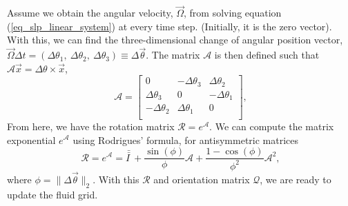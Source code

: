 Assume we obtain the angular velocity, $\vec{\Omega}$, from solving equation (\ref{eq_slp_linear_system}) at every time step. (Initially, it is the zero vector). With this, we can find the three-dimensional change of angular position vector, $ \vec{\Omega} \Delta t = \left( \Delta \theta_1, \ \Delta \theta_2, \ \Delta \theta_3 \right) \equiv \Delta \vec{\theta}$.
The matrix $\mathcal{A}$ is then defined such that $\mathcal{A} \vec{x} = \Delta \theta \times \vec{x}$,
\begin{equation}
	\mathcal{A}
	=\begin{bmatrix}
	 0 & - \Delta \theta_3 & \Delta \theta_2  \\
	 \Delta \theta_3 & 0  & -\Delta \theta_1  \\
	 - \Delta \theta_2 & \Delta \theta_1 & 0  \\
	\end{bmatrix},
	\label{eq_rotation_mx}
\end{equation}
From here, we have the rotation matrix $\mathcal{R} = e^{\mathcal{A}}.$
We can compute the matrix exponential $e^{\mathcal{A}}$ using Rodrigues' formula, for antisymmetric matrices
\begin{equation}
	\mathcal{R} = 
e^{\mathcal{A}} 
 = \bar{\bar{I \ }} 
 + \frac{\sin(\phi)}{\phi} \mathcal{A}
 + \frac{1-\cos(\phi)}{\phi^2} \mathcal{A}^2,
\label{eq_R_eA}
\end{equation} 
where $\phi = \|\Delta \vec{\theta}\|_2$.
With this $\mathcal{R}$ and orientation matrix $\mathcal{Q}$, we are ready to update the fluid grid.


	
